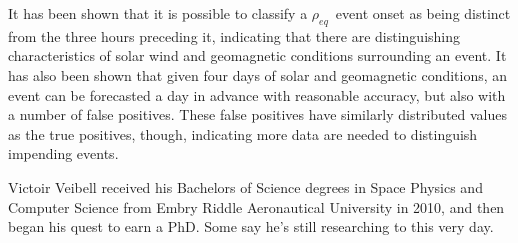 \documentclass[11 pt]{GMUDissertation}
\newcommand{\req}{\ensuremath{\rho_{eq}}} %
\begin{document}
It has been shown that it is possible to classify a \req\ event onset as being distinct from the three hours preceding it, indicating that there are distinguishing characteristics of solar wind and geomagnetic conditions surrounding an event. It has also been shown that given four days of solar and geomagnetic conditions, an event can be forecasted a day in advance with reasonable accuracy, but also with a number of false positives. These false positives have similarly distributed values as the true positives, though, indicating more data are needed to distinguish impending events.

%
\startofchapters








%




%
%



\cvpage

\noindent Victoir Veibell received his Bachelors of Science degrees in Space Physics and Computer Science from Embry Riddle Aeronautical University in 2010, and then began his quest to earn a PhD. Some say he's still researching to this very day.
\end{document}
